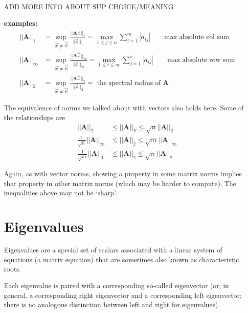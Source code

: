 \documentclass[12pt]{article}
\newcommand{\ve}[1]{\ensuremath{\mathbf{#1}}}
\begin{document}
ADD MORE INFO ABOUT SUP CHOICE/MEANING

\textbf{examples:}
%
\begin{align}
||\ve{A}||_{1} &= \displaystyle \sup_{\vec{x} \neq \vec{0}} \frac{||\ve{A}\vec{x}||_{1}}{||\vec{x}||_{1}} =
\displaystyle \max_{1 \leq j \leq n} \sum_{i=1}^m |a_{ij}| \qquad \text{max absolute col sum} \nonumber \\
%
||\ve{A}||_{\infty} &= \displaystyle \sup_{\vec{x} \neq \vec{0}} \frac{||\ve{A}\vec{x}||_{\infty}}{||\vec{x}||_{\infty}} = 
\displaystyle \max_{1 \leq i \leq m} \sum_{j=1}^n |a_{ij}| \qquad \text{max absolute row sum}\nonumber \\
%
||\ve{A}||_{2} &= \displaystyle \sup_{\vec{x} \neq \vec{0}} \frac{||\ve{A}\vec{x}||_{2}}{||\vec{x}||_{2}} = \text{ the spectral radius of }\ve{A} \nonumber 
\end{align}

The equivalence of norms we talked about with vectors also holds here. Some of the relationships are
%
\begin{align}
||\ve{A}||_{2} &\leq ||\ve{A}||_{F} \leq \sqrt{n}||\ve{A}||_{2} \nonumber \\
%
\frac{1}{\sqrt{n}}||\ve{A}||_{\infty} &\leq ||\ve{A}||_{2} \leq \sqrt{m}||\ve{A}||_{\infty} \nonumber \\
%
\frac{1}{\sqrt{m}}||\ve{A}||_{1} &\leq ||\ve{A}||_{2} \leq \sqrt{n}||\ve{A}||_{2} \nonumber
\end{align}

Again, as with vector norms, showing a property in some matrix norms implies that property in other matrix norms (which may be harder to compute). The inequalities above may not be `sharp'.


\section{Eigenvalues}

Eigenvalues are a special set of scalars associated with a linear system of equations (a matrix equation) that are sometimes also known as characteristic roots. 

Each eigenvalue is paired with a corresponding so-called eigenvector (or, in general, a corresponding right eigenvector and a corresponding left eigenvector; there is no analogous distinction between left and right for eigenvalues).
\end{document}

